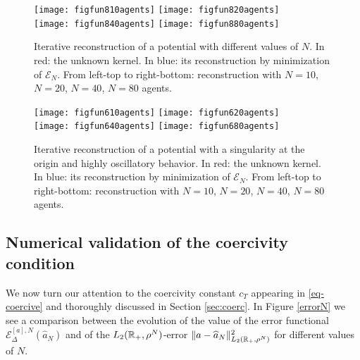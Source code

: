 \begin{figure}[h!]
\begin{center}
\hspace{-0.7cm}\texttt{[image: figfun810agents]}\hspace{-0.9cm}
\texttt{[image: figfun820agents]}\\
\hspace{-0.7cm}\texttt{[image: figfun840agents]}\hspace{-0.9cm}
\texttt{[image: figfun880agents]}
\end{center}
\caption{Iterative reconstruction of a potential with different values of $N$. In red: the unknown kernel. In blue: its reconstruction by minimization of $\mathcal{E}_N$. From left-top to right-bottom: reconstruction with $N = 10$, $N = 20$, $N = 40$, $N = 80$ agents.}\label{variableN}
\end{figure}

\begin{figure}[h!]
\begin{center}
\hspace{-0.7cm}\texttt{[image: figfun610agents]}\hspace{-0.9cm}
\texttt{[image: figfun620agents]}\\
\hspace{-0.7cm}\texttt{[image: figfun640agents]}\hspace{-0.9cm}
\texttt{[image: figfun680agents]}
\end{center}
\caption{Iterative reconstruction of a potential with a singularity at the origin and highly oscillatory behavior. In red: the unknown kernel. In blue: its reconstruction by minimization of $\mathcal{E}_N$. From left-top to right-bottom: reconstruction with $N = 10$, $N = 20$, $N = 40$, $N = 80$ agents.}\label{variableN2}
\end{figure}

\subsection{Numerical validation of the coercivity condition}

We now turn our attention to the coercivity constant $c_T$ appearing in \eqref{eq-coercive} and thoroughly discussed in Section \ref{sec:coerc}. In Figure \ref{errorN} we see a comparison between the evolution of the value of the error functional $\mathcal{E}^{[a],N}_\Delta(\widehat{a}_N)$ and of the $L_2(\mathbb{R}_+,\rho^N)$-error $\|a-\widehat{a}_N\|^2_{L_2(\mathbb{R}_+,\rho^N)}$ for different values of $N$. 


